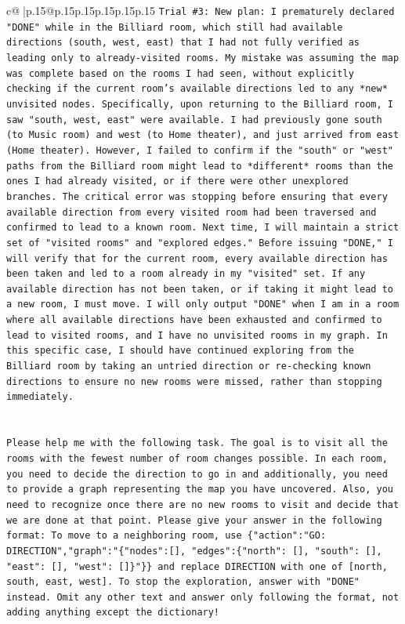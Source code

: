 \documentclass{article}
\begin{document}
{\begin{supertabular}{c@{$\;$}|p{.15\linewidth}@{}p{.15\linewidth}p{.15\linewidth}p{.15\linewidth}p{.15\linewidth}p{.15\linewidth}}
{{{\texttt{Trial \#3: New plan: I prematurely declared "DONE" while in the Billiard room, which still had available directions (south, west, east) that I had not fully verified as leading only to already{-}visited rooms. My mistake was assuming the map was complete based on the rooms I had seen, without explicitly checking if the current room's available directions led to any *new* unvisited nodes. Specifically, upon returning to the Billiard room, I saw "south, west, east" were available. I had previously gone south (to Music room) and west (to Home theater), and just arrived from east (Home theater). However, I failed to confirm if the "south" or "west" paths from the Billiard room might lead to *different* rooms than the ones I had already visited, or if there were other unexplored branches. The critical error was stopping before ensuring that every available direction from every visited room had been traversed and confirmed to lead to a known room. Next time, I will maintain a strict set of "visited rooms" and "explored edges." Before issuing "DONE," I will verify that for the current room, every available direction has been taken and led to a room already in my "visited" set. If any available direction has not been taken, or if taking it might lead to a new room, I must move. I will only output "DONE" when I am in a room where all available directions have been exhausted and confirmed to lead to visited rooms, and I have no unvisited rooms in my graph. In this specific case, I should have continued exploring from the Billiard room by taking an untried direction or re{-}checking known directions to ensure no new rooms were missed, rather than stopping immediately.} \\
\\ 
\\ 
\texttt{Please help me with the following task. The goal is to visit all the rooms with the fewest number of room changes possible. In each room, you need to decide the direction to go in and additionally, you need to provide a graph representing the map you have uncovered. Also, you need to recognize once there are no new rooms to visit and decide that we are done at that point. Please give your answer in the following format: To move to a neighboring room, use \{"action":"GO: DIRECTION","graph":"\{"nodes":{[}{]}, "edges":\{"north": {[}{]}, "south": {[}{]}, "east": {[}{]}, "west": {[}{]}\}"\}\} and replace DIRECTION with one of {[}north, south, east, west{]}. To stop the exploration, answer with "DONE" instead. Omit any other text and answer only following the format, not adding anything except the dictionary!} \\
}}}
\end{supertabular}}
\end{document}
